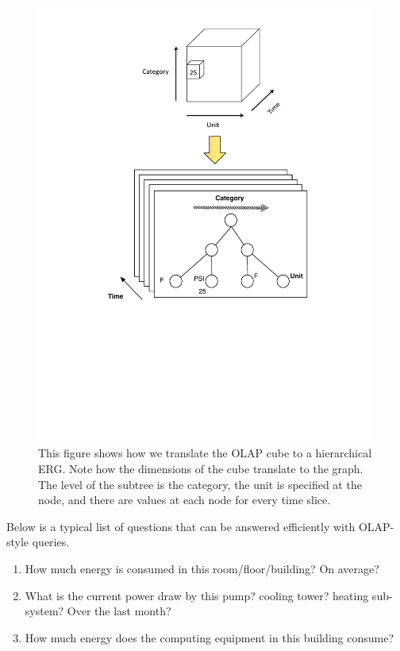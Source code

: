 \begin{figure}[h!] %
\centering
\includegraphics[width=.55\columnwidth]{figs/olaptoerg}
\caption{This figure shows how we translate the OLAP cube to a hierarchical ERG.  Note how the dimensions of the cube translate
to the graph.  The level of the subtree is the category, the unit is specified at the node, and there are values at each node
for every time slice.}
\label{fig:olap2erg}
\end{figure}

Below is a typical list of questions that can be answered efficiently with OLAP-style queries.  

\begin{enumerate}
\item How much energy is consumed in this room/floor/building?  On average?
\item What is the current power draw by this pump? cooling tower? heating sub-system?  Over
		the last month?
\item How much energy does the computing equipment in this building consume?
\end{enumerate}
\vspace{0.08in}

